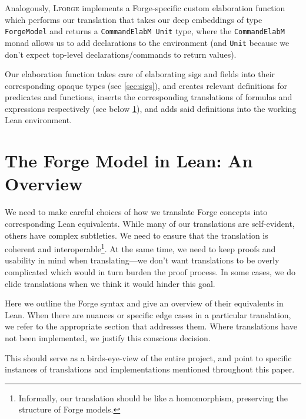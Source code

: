Analogously, \textsc{Lforge} implements a Forge-specific custom elaboration function which performs our translation that takes our deep embeddings of type \texttt{ForgeModel} and returns a \texttt{CommandElabM Unit} type, where the \texttt{CommandElabM} monad allows us to add declarations to the environment (and \texttt{Unit} because we don't expect top-level declarations/commands to return values). 

Our elaboration function takes care of elaborating sigs and fields into their corresponding opaque types (see \cref{sec:sigs}), and creates relevant definitions for predicates and functions, inserts the corresponding translations of formulas and expressions respectively (see below \cref{sec:forge-model}), and adds said definitions into the working Lean environment.

\newpage
\section{The Forge Model in Lean: An Overview}\label{sec:forge-model}
We need to make careful choices of how we translate Forge concepts into corresponding Lean equivalents. While many of our translations are self-evident, others have complex subtleties. We need to ensure that the translation is coherent and interoperable\footnote{Informally, our translation should be like a homomorphism, preserving the structure of Forge models.}. At the same time, we need to keep proofs and usability in mind when translating---we don't want translations to be overly complicated which would in turn burden the proof process. In some cases, we do elide translations when we think it would hinder this goal. 

Here we outline the Forge syntax and give an overview of their equivalents in Lean. When there are nuances or specific edge cases in a particular translation, we refer to the appropriate section that addresses them. Where translations have not been implemented, we justify this conscious decision. 

This should serve as a birds-eye-view of the entire project, and point to specific instances of translations and implementations mentioned throughout this paper. 

